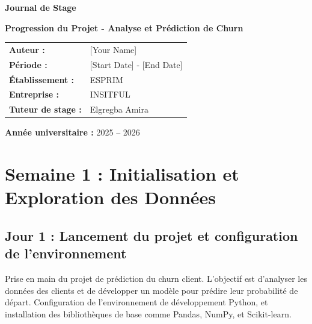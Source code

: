 \documentclass[11pt, a4paper]{report}
\begin{document}
\begin{titlepage}
    \thispagestyle{empty}
    \sffamily
    \begin{center}
        \vspace*{5.5cm}
        {\Huge\bfseries\textcolor{coverblue}{Journal de Stage}}\par
        \vspace{1.4cm}
        {\Large\bfseries\textcolor{coverburgundy}{Progression du Projet - Analyse et Prédiction de Churn}}\par
        \vspace{2.8cm}
        {\large
        \begin{tabular}{@{}ll@{}}
            \textcolor{covertext}{\textbf{Auteur :}} & \textcolor{covertext}{[Your Name]} \\[0.4cm]
            \textcolor{covertext}{\textbf{Période :}} & \textcolor{covertext}{[Start Date] - [End Date]} \\[0.4cm]
            \textcolor{covertext}{\textbf{Établissement :}} & \textcolor{covertext}{ESPRIM} \\[0.4cm]
            \textcolor{covertext}{\textbf{Entreprise :}} & \textcolor{covertext}{INSITFUL} \\[0.4cm]
            \textcolor{covertext}{\textbf{Tuteur de stage :}} & \textcolor{covertext}{Elgregba Amira} \\
        \end{tabular}}
        \vspace{3cm}

        {\Large\textcolor{covertext}{\textbf{Année universitaire :} 2025 -- 2026}}\par
    \end{center}
    \vfill
\end{titlepage}

\tableofcontents
\newpage

\chapter{Semaine 1 : Initialisation et Exploration des Données}
\section{Jour 1 : Lancement du projet et configuration de l'environnement}
Prise en main du projet de prédiction du churn client. L'objectif est d'analyser les données des clients et de développer un modèle pour prédire leur probabilité de départ. Configuration de l'environnement de développement Python, et installation des bibliothèques de base comme Pandas, NumPy, et Scikit-learn.
\end{document}
